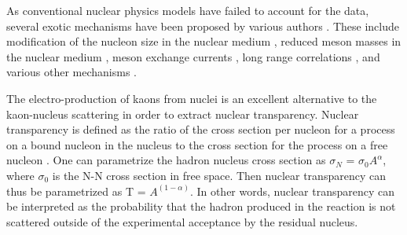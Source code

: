 As conventional nuclear physics models have failed to account for the data, several exotic mechanisms have been proposed by various authors \cite{ernst95}. These include modification of the nucleon size in the nuclear medium \cite{skg1}, reduced meson masses in the nuclear medium \cite{kccth4}, meson exchange currents \cite{kccth5,kccth6}, long range correlations \cite{kccth7}, and various other mechanisms \cite{kccth8}. 

%
The electro-production of kaons from nuclei is an excellent alternative to the kaon-nucleus scattering in order to extract nuclear transparency. Nuclear transparency is defined as the ratio of the cross section per nucleon for a process on a bound nucleon in the nucleus to the cross section for the process on a free nucleon \cite{Dutta:2004kw}. One can parametrize the hadron nucleus cross section as $\sigma_N$ = $\sigma_0 A^{\alpha}$, where $\sigma_0$ is the N-N cross section in free space. Then nuclear transparency can thus be parametrized as T = $A^{(1-\alpha)}$. In other words, nuclear transparency can be interpreted as the probability that the hadron produced in the reaction is not scattered outside of the experimental acceptance by the residual nucleus.

